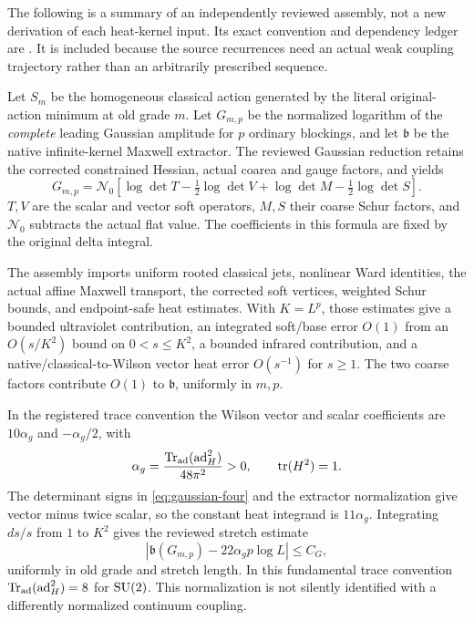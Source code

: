 The following is a summary of an independently reviewed assembly, not a new derivation of each heat-kernel input. Its exact convention and dependency ledger are . It is included because the source recurrences need an actual weak coupling trajectory rather than an arbitrarily prescribed sequence.

Let $S_m$ be the homogeneous classical action generated by the literal original-action minimum at old grade $m$. Let $G_{m,p}$ be the normalized logarithm of the \emph{complete} leading Gaussian amplitude for $p$ ordinary blockings, and let $\mathfrak b$ be the native infinite-kernel Maxwell extractor. The reviewed Gaussian reduction retains the corrected constrained Hessian, actual coarea and gauge factors, and yields
\begin{equation}\label{eq:gaussian-four}
 G_{m,p}=\mathcal N_0\left[
 \log\det T-\tfrac12\log\det V+
 \log\det M-\tfrac12\log\det S\right].
\end{equation}
$T,V$ are the scalar and vector soft operators, $M,S$ their coarse Schur factors, and $\mathcal N_0$ subtracts the actual flat value. The coefficients in this formula are fixed by the original delta integral.

The assembly imports uniform rooted classical jets, nonlinear Ward identities, the actual affine Maxwell transport, the corrected soft vertices, weighted Schur bounds, and endpoint-safe heat estimates. With $K=L^p$, those estimates give a bounded ultraviolet contribution, an integrated soft/base error $O(1)$ from an $O(s/K^2)$ bound on $0<s\le K^2$, a bounded infrared contribution, and a native/classical-to-Wilson vector heat error $O(s^{-1})$ for $s\ge1$. The two coarse factors contribute $O(1)$ to $\mathfrak b$, uniformly in $m,p$.

In the registered trace convention the Wilson vector and scalar coefficients are $10\alpha_g$ and $-\alpha_g/2$, with
\[
 \alpha_g=\frac{\operatorname{Tr}_{\mathrm{ad}}(\mathrm{ad}_H^2)}{48\pi^2}>0,
 \qquad\operatorname{tr}(H^2)=1.
\]
The determinant signs in \eqref{eq:gaussian-four} and the extractor normalization give vector minus twice scalar, so the constant heat integrand is $11\alpha_g$. Integrating $ds/s$ from $1$ to $K^2$ gives the reviewed stretch estimate
\begin{equation}\label{eq:stretch}
 \left|\mathfrak b(G_{m,p})-22\alpha_g p\log L\right|\le C_G,
\end{equation}
uniformly in old grade and stretch length. In this fundamental trace convention $\operatorname{Tr}_{\mathrm{ad}}(\mathrm{ad}_H^2)=8$ for $\mathrm{SU}(2)$. This normalization is not silently identified with a differently normalized continuum coupling.

